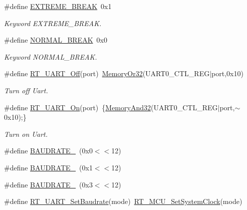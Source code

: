 \begin{DoxyCompactItemize}
\item 
\mbox{\label{a00056_a7c76b3ed72795f2085873ee332fdab1b}} 
\#define \mbox{\hyperlink{a00056_a7c76b3ed72795f2085873ee332fdab1b}{E\+X\+T\+R\+E\+M\+E\+\_\+\+B\+R\+E\+AK}}~0x1
\begin{DoxyCompactList}\small\item\em Keyword E\+X\+T\+R\+E\+M\+E\+\_\+\+B\+R\+E\+AK. \end{DoxyCompactList}\item 
\mbox{\label{a00056_a7d77cd41951b1fe6b0874924df2bf689}} 
\#define \mbox{\hyperlink{a00056_a7d77cd41951b1fe6b0874924df2bf689}{N\+O\+R\+M\+A\+L\+\_\+\+B\+R\+E\+AK}}~0x0
\begin{DoxyCompactList}\small\item\em Keyword N\+O\+R\+M\+A\+L\+\_\+\+B\+R\+E\+AK. \end{DoxyCompactList}\item 
\#define \mbox{\hyperlink{a00056_a60de547d761052a56b69e4a75493b831}{R\+T\+\_\+\+U\+A\+R\+T\+\_\+\+Off}}(port)~\mbox{\hyperlink{a00020_a9ea92ebccdef6bdaca4d00210cc7266d}{Memory\+Or32}}(U\+A\+R\+T0\+\_\+\+C\+T\+L\+\_\+\+R\+EG$\vert$port,0x10)
\begin{DoxyCompactList}\small\item\em Turn off Uart. \end{DoxyCompactList}\item 
\#define \mbox{\hyperlink{a00056_a7c1428a7b16eec7fe710679dd70b4069}{R\+T\+\_\+\+U\+A\+R\+T\+\_\+\+On}}(port)~\{\mbox{\hyperlink{a00020_a5c1a2bd4c1bd4c2f429d8042a45327ff}{Memory\+And32}}(U\+A\+R\+T0\+\_\+\+C\+T\+L\+\_\+\+R\+EG$\vert$port,$\sim$0x10);\}
\begin{DoxyCompactList}\small\item\em Turn on Uart. \end{DoxyCompactList}\item 
\#define \mbox{\hyperlink{a00056_a89d72bee69b33d0404d33f47608d16f0}{B\+A\+U\+D\+R\+A\+T\+E\+\_}}~(0x0$<$$<$12)
\item 
\#define \mbox{\hyperlink{a00056_ab94a89ecf1976f304764aec119e215e7}{B\+A\+U\+D\+R\+A\+T\+E\+\_}}~(0x1$<$$<$12)
\item 
\#define \mbox{\hyperlink{a00056_a9c74d2185a532185624b8dc3086f8e3e}{B\+A\+U\+D\+R\+A\+T\+E\+\_}}~(0x3$<$$<$12)
\item 
\#define \mbox{\hyperlink{a00056_a565befb27caf782083358e0ad81af3a3}{R\+T\+\_\+\+U\+A\+R\+T\+\_\+\+Set\+Baudrate}}(mode)~\mbox{\hyperlink{a00020_a8e87aa8d85986723da69a68cd0d1e51c}{R\+T\+\_\+\+M\+C\+U\+\_\+\+Set\+System\+Clock}}(mode)
$$
\end{DoxyCompactItemize}

